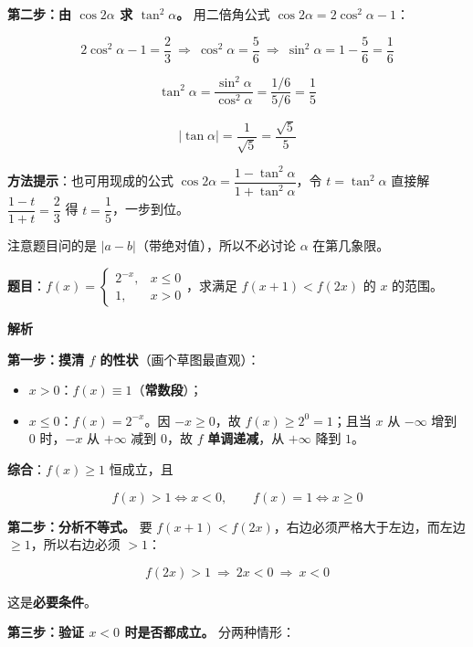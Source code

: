 \textbf{第二步：由 $\cos2\alpha$ 求 $\tan^{2}\alpha$。} 用二倍角公式 $\cos2\alpha=2\cos^{2}\alpha-1$：

\[2\cos^{2}\alpha-1=\frac23\ \Longrightarrow\ \cos^{2}\alpha=\frac56\ \Longrightarrow\ \sin^{2}\alpha=1-\frac56=\frac16\]

\[\tan^{2}\alpha=\frac{\sin^{2}\alpha}{\cos^{2}\alpha}=\frac{1/6}{5/6}=\frac15\]

\[|\tan\alpha|=\frac1{\sqrt5}=\frac{\sqrt5}5\]


\begin{gktip}
\textbf{方法提示}：也可用现成的公式 $\cos2\alpha=\dfrac{1-\tan^{2}\alpha}{1+\tan^{2}\alpha}$，令 $t=\tan^{2}\alpha$ 直接解 $\dfrac{1-t}{1+t}=\dfrac23$ 得 $t=\dfrac15$，一步到位。

注意题目问的是 $|a-b|$（带绝对值），所以不必讨论 $\alpha$ 在第几象限。
\end{gktip}

\par\medskip


\textbf{题目}：$f(x)=\begin{cases}2^{-x},&x\le0\\ 1,&x>0\end{cases}$，求满足 $f(x+1)<f(2x)$ 的 $x$ 的范围。

\textbf{解析}

\textbf{第一步：摸清 $f$ 的性状}（画个草图最直观）：

\begin{itemize}
\item $x>0$：$f(x)\equiv1$（\textbf{常数段}）；
\item $x\le0$：$f(x)=2^{-x}$。因 $-x\ge0$，故 $f(x)\ge2^{0}=1$；且当 $x$ 从 $-\infty$ 增到 $0$ 时，$-x$ 从 $+\infty$ 减到 $0$，故 $f$ \textbf{单调递减}，从 $+\infty$ 降到 $1$。
\end{itemize}

\textbf{综合}：$f(x)\ge1$ 恒成立，且

\[f(x)>1\iff x<0,\qquad f(x)=1\iff x\ge0\]

\textbf{第二步：分析不等式。} 要 $f(x+1)<f(2x)$，右边必须严格大于左边，而左边 $\ge1$，所以右边必须 $>1$：

\[f(2x)>1\ \Longrightarrow\ 2x<0\ \Longrightarrow\ x<0\]

这是\textbf{必要条件}。

\textbf{第三步：验证 $x<0$ 时是否都成立。} 分两种情形：

